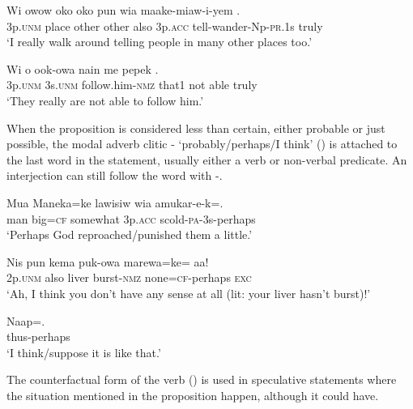 \ea%
\label{ex:6:x1050}
\gll Wi  owow  oko  oko  pun  wia  maake-miaw-i-yem . \\
3p.\textsc{unm}  place  other  other  also  3p.\textsc{acc}  tell-wander-Np-\textsc{pr}.1s truly\\
\glt `I really walk around telling people in many other places too.'
\z
{}

\ea%
\label{ex:6:x1051}
\gll Wi  o  ook-owa  nain  me  pepek  . \\
3p.\textsc{unm}  3s.\textsc{unm}  follow.him-\textsc{nmz}  that1  not  able  truly\\
\glt `They really are not able to follow him.'
\z

When the proposition is considered less than certain, either probable or just possible, the modal adverb clitic - `probably/perhaps/I think' () is attached to the last word in the statement, usually either a verb or non-verbal predicate. An interjection can still follow the word with -.

\ea%
\label{ex:6:x1052}
\gll Mua  Maneka=ke  lawisiw  wia  amukar-e-k=. \\
man  big=\textsc{cf}  somewhat  3p.\textsc{acc}  scold-\textsc{pa}-3s-perhaps\\
\glt `Perhaps God reproached/punished them a little.'
\z

\ea%
\label{ex:6:x1053}
\gll Nis  pun  kema  puk-owa  marewa=ke=  aa! \\
2p.\textsc{unm}  also  liver  burst-\textsc{nmz}  none=\textsc{cf}-perhaps  \textsc{exc}\\
\glt `Ah, I think you don't have any sense at all (lit: your liver hasn't burst)!'
\z

\ea%
\label{ex:6:x1071}
\gll Naap=. \\
thus-perhaps\\
\glt `I think/suppose it is like that.'
\z

The counterfactual form of the verb () is used in speculative statements where the situation mentioned in the proposition  happen, although it could have. 

